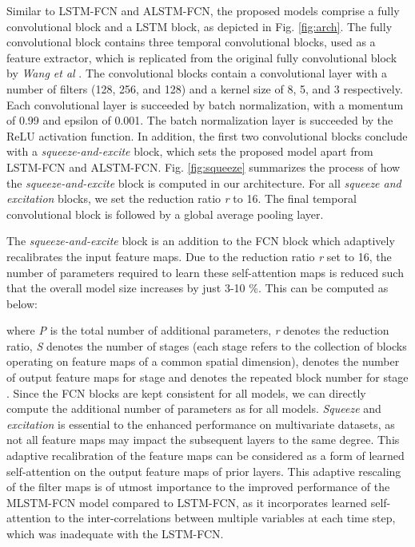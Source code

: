 \documentclass[preprint,12pt,3p]{elsarticle}
\begin{document}
Similar to LSTM-FCN and ALSTM-FCN, the proposed models comprise a fully convolutional block and a LSTM block, as depicted in Fig. \ref{fig:arch}. The fully convolutional block contains three temporal convolutional blocks, used as a feature extractor, which is replicated from the original fully convolutional block by \textit{Wang et al} \cite{wang2017time}. The convolutional blocks contain a convolutional layer with a number of filters (128, 256, and 128) and a kernel size of 8, 5, and 3 respectively. Each convolutional layer is succeeded by batch normalization, with a momentum of 0.99 and epsilon of 0.001. The batch normalization layer is succeeded by the ReLU activation function. In addition, the first two convolutional blocks conclude with a \textit{squeeze-and-excite} block, which sets the proposed model apart from LSTM-FCN and ALSTM-FCN. Fig. \ref{fig:squeeze} summarizes the process of how the \textit{squeeze-and-excite} block is computed in our architecture.  For all \textit{squeeze and excitation} blocks, we set the reduction ratio \textit{r} to 16. The final temporal convolutional block is followed by a global average pooling layer. 

The \textit{squeeze-and-excite} block is an addition to the FCN block which adaptively recalibrates the input feature maps. Due to the reduction ratio \textit{r} set to 16, the number of parameters required to learn these self-attention maps is reduced such that the overall model size increases by just 3-10 \%. This can be computed as below:
 

 
where \textit{P} is the total number of additional parameters, \textit{r} denotes the reduction ratio, \textit{S} denotes the number of stages (each stage refers to the collection of blocks operating on feature maps of a common spatial dimension),  denotes the number of output feature maps for stage  and  denotes the repeated block number for stage . Since the FCN blocks are kept consistent for all models, we can directly compute the additional number of parameters as  for all models. \textit{Squeeze} and \textit{excitation} is essential to the enhanced performance on multivariate datasets, as not all feature maps may impact the subsequent layers to the same degree. This adaptive recalibration of the feature maps can be considered as a form of learned self-attention on the output feature maps of prior layers. This adaptive rescaling of the filter maps is of utmost importance to the improved performance of the MLSTM-FCN model compared to LSTM-FCN, as it incorporates learned self-attention to the inter-correlations between multiple variables at each time step, which was inadequate with the LSTM-FCN.
\end{document}
